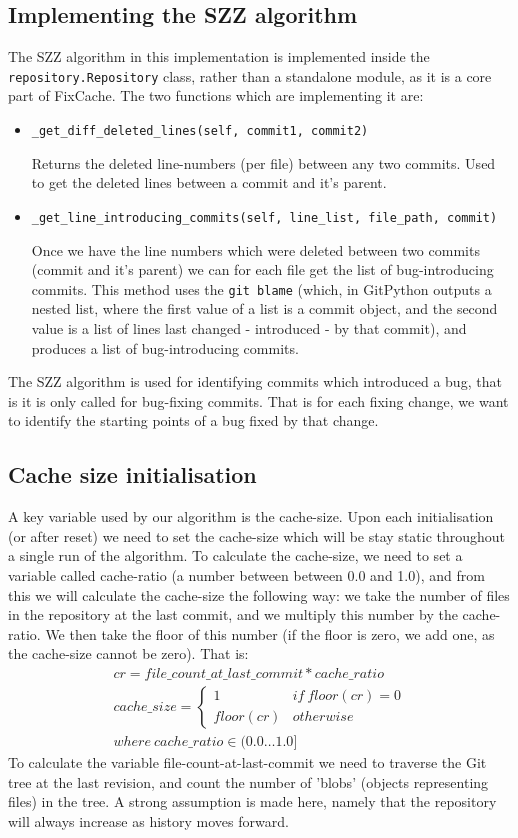 \documentclass[12pt,twoside,notitlepage]{report}
\newcommand{\fxch}{FixCache}
\begin{document}
\subsection{Implementing the SZZ algorithm}
The SZZ algorithm in this implementation is implemented inside the \texttt{repository.Repository} class, rather than a standalone module, as it is a core part of \fxch{}.
The two functions which are implementing it are:
\begin{itemize}
\item \texttt{\_get\_diff\_deleted\_lines(self, commit1, commit2)}

Returns the deleted line-numbers (per file) between any two commits. Used to get the deleted lines between a commit and it's parent.
\item \texttt{\_get\_line\_introducing\_commits(self, line\_list, file\_path, commit)}

Once we have the line numbers which were deleted between two commits (commit and it's parent) we can for each file get the list of bug-introducing commits. This method uses the \texttt{git blame} (which, in GitPython outputs a nested list, where the first value of a list is a commit object, and the second value is a list of lines last changed - introduced - by that commit), and produces a list of bug-introducing commits.
\end{itemize}
The SZZ algorithm is used for identifying commits which introduced a bug, that is it is only called for bug-fixing commits. That is for each fixing change, we want to identify the starting points of a bug fixed by that change.
\subsection{Cache size initialisation} A key variable used by our algorithm is the cache-size. Upon each initialisation (or after reset) we need to set the cache-size which will be stay static throughout a single run of the algorithm. To calculate the cache-size, we need to set a variable called cache-ratio (a number between between 0.0 and 1.0), and from this we will calculate the cache-size the following way: we take the number of files in the repository at the last commit, and we multiply this number by the cache-ratio. We then take the floor of this number (if the floor is zero, we add one, as the cache-size cannot be zero). That is:
\begin{align*}
	cr = file\_count\_at\_last\_commit*cache\_ratio\\
	cache\_size = \begin{cases}
						1 & if\ floor(cr) = 0\\
						floor(cr) & otherwise
					\end{cases}\\
	where\ cache\_ratio \in (0.0\dots 1.0]
\end{align*}
To calculate the variable file-count-at-last-commit we need to traverse the Git tree at the last revision, and count the number of 'blobs' (objects representing files) in the tree. A strong assumption is made here, namely that the repository will always increase as history moves forward. 
\end{document}
